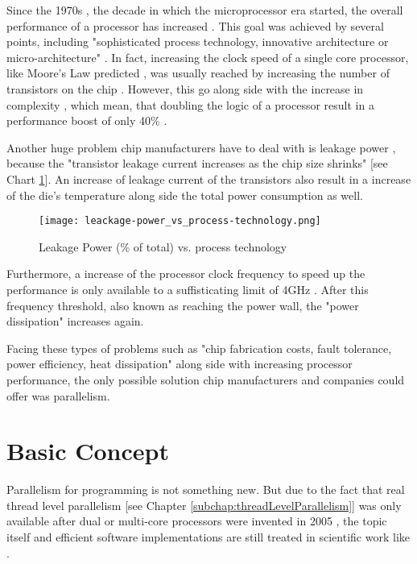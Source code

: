 Since the 1970s \parencite{article14}, the decade in which the microprocessor era started, the overall performance of a processor has increased \parencite{inproceedings4}. This goal was achieved by several points, including "sophisticated process technology, innovative architecture or micro-architecture" \parencite[see][Chapter 1, p2]{inproceedings4}. In fact, increasing the clock speed of a single core processor, like Moore's Law predicted \parencite{article14}, was usually reached by increasing the number of transistors on the chip \parencite{article14}. However, this go along side with the increase in complexity \parencite[see][Pollack’s rule]{article14}, which mean, that doubling the logic of a processor result in a performance boost of only 40\% \parencite[see][Chapter 2]{article14}.

Another huge problem chip manufacturers have to deal with is leakage power \parencite[see][Chapter 2, p3]{inproceedings4}, because the "transistor leakage current increases as the chip size shrinks" \parencite[see][p2]{article14} [see Chart \ref{fig:leackagePer}]. An increase of leakage current of the transistors also result in a increase of the die's temperature \parencite{inproceedings4} along side the total power consumption as well.
\begin{figure}[h!]
	\centering
	\texttt{[image: leackage-power\_vs\_process-technology.png]}
	\caption{
		Leakage Power (\% of total) vs. process technology \parencite{inproceedings4}
	}
	\label{fig:leackagePer}
\end{figure}

Furthermore, a increase of the processor clock frequency to speed up the performance is only available to a suffisticating limit of 4GHz \parencite{article14}. After this frequency threshold, also known as reaching the power wall, the "power dissipation" \parencite[see][p2]{article14} increases again.

Facing these types of problems such as "chip fabrication costs, fault tolerance, power efficiency, heat dissipation" \parencite[see][p3]{article14} along side with increasing processor performance, the only possible solution chip manufacturers and companies could offer was parallelism. 

\newpage

\section{Basic Concept}

Parallelism for programming is not something new. But due to the fact that real thread level parallelism [see Chapter \ref{subchap:threadLevelParallelism}] was only available after dual or multi-core processors were invented in 2005 \parencite{internet6}, the topic itself and efficient software implementations are still treated in scientific work like \parencite{book3} \parencite{article2}.

